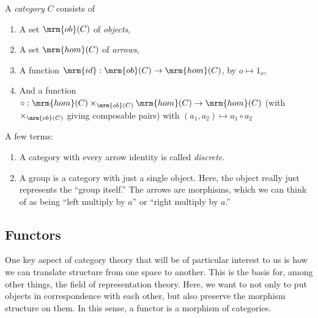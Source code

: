 \documentclass{fkbook}
\newcommand{\ob}{\mrm{ob}}
\newcommand{\homm}{\mrm{hom}}
\begin{document}
\begin{definition}[Category]
  A \emph{category} $C$ consists of
  \begin{enumerate}[label=\arabic*)]
    \item A set $\ob(C)$ of \emph{objects},
    \item A set $\homm(C)$ of \emph{arrows},
    \item A function $\mrm{id} : \ob(C) \to \homm(C)$, by $o \mapsto
      1_o$,
    \item And a function $\circ : \homm(C) \times_{\ob(C)} \homm(C)
      \to \homm(C)$ (with $\times_{\ob(C)}$ giving composable pairs)
      with $(a_1, a_2) \mapsto a_1 \circ a_2$
  \end{enumerate}
\end{definition}

A few terms:
\begin{enumerate}
  \item A category with every arrow identity is called
    \emph{discrete}.
  \item A group is a category with just a single object. Here, the
    object really just represents the ``group itself.'' The arrows are
    morphisms, which we can think of as being ``left multiply by $a$''
    or ``right multiply by $a$.''
\end{enumerate}

\subsection{Functors}
One key aspect of category theory that will be of particular interest
to us is how we can translate structure from one space to another.
This is the basis for, among other things, the field of representation
theory. Here, we want to not only to put objects in correspondence
with each other, but also preserve the morphism structure on them. In
this sense, a functor is a morphism of categories.
\end{document}
